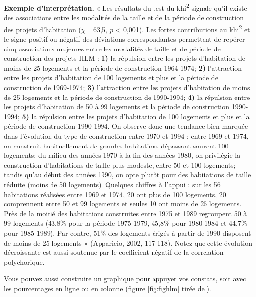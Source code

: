 \documentclass[
  11pt,
  french,
]{book}
\begin{document}
\textbf{Exemple d'interprétation.} « Les résultats du test du khi\textsuperscript{2} signale qu'il existe des associations entre les modalités de la taille et de la période de construction des projets d'habitation (\(\chi\) =63,5, \emph{p} \textless{} 0,001). Les fortes contributions au khi\textsuperscript{2} et le signe positif ou négatif des déviations correspondantes permettent de repérer cinq associations majeures entre les modalités de taille et de période de construction des projets HLM : \textbf{1)} la répulsion entre les projets d'habitation de moins de 25 logements et la période de construction 1964-1974; \textbf{2)} l'attraction entre les projets d'habitation de 100 logements et plus et la période de construction de 1969-1974; \textbf{3)} l'attraction entre les projets d'habitation de moins de 25 logements et la période de construction de 1990-1994; \textbf{4)} la répulsion entre les projets d'habitation de 50 à 99 logements et la période de construction 1990-1994; \textbf{5)} la répulsion entre les projets d'habitation de 100 logements et plus et la période de construction 1990-1994.
On observe donc une tendance bien marquée dans l'évolution du type de construction entre 1970 et 1994 : entre 1969 et 1974, on construit habituellement de grandes habitations dépassant souvent 100 logements; du milieu des années 1970 à la fin des années 1980, on privilégie la construction d'habitations de taille plus modeste, entre 50 et 100 logements; tandis qu'au début des années 1990, on opte plutôt pour des habitations de taille réduite (moins de 50 logements). Quelques chiffres à l'appui : sur les 56 habitations réalisées entre 1969 et 1974, 20 ont plus de 100 logements, 20 comprennent entre 50 et 99 logements et seules 10 ont moins de 25 logements. Près de la moitié des habitations construites entre 1975 et 1989 regroupent 50 à 99 logements (43,8\% pour la période 1975-1979, 45,8\% pour 1980-1984 et 44,7\% pour 1985-1989). Par contre, 51\% des logements érigés à partir de 1990 disposent de moins de 25 logements » (Apparicio, 2002, 117-118). Notez que cette évolution décroissante est aussi soutenue par le coefficient négatif de la corrélation polychorique.

Vous pouvez aussi construire un graphique pour appuyer vos constats, soit avec les pourcentages en ligne ou en colonne (figure \ref{fig:fighlm} tirée de \citet{apparicio2006}).
\end{document}
